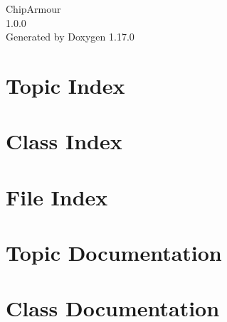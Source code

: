 \documentclass[twoside]{book}
\newcommand{\+}{\discretionary{\mbox{\scriptsize$\hookleftarrow$}}{}{}}
\newcommand{\clearemptydoublepage}{%
    \newpage{\pagestyle{empty}\cleardoublepage}%
  }
\begin{document}
  \raggedbottom
    \hypersetup{pageanchor=false,
                bookmarksnumbered=true,
                pdfencoding=unicode
               }
  \begin{titlepage}
  \vspace*{7cm}
  \begin{center}%
  {\Large Chip\+Armour}\\
  [1ex]\large 1.\+0.\+0 \\
  \vspace*{1cm}
  {\large Generated by Doxygen 1.17.0}\\
  \end{center}
  \end{titlepage}
  \clearemptydoublepage
  \tableofcontents
  \clearemptydoublepage
  \hypersetup{pageanchor=true}


\chapter{Topic Index}

\chapter{Class Index}

\chapter{File Index}

\chapter{Topic Documentation}



\chapter{Class Documentation}


























\end{document}
